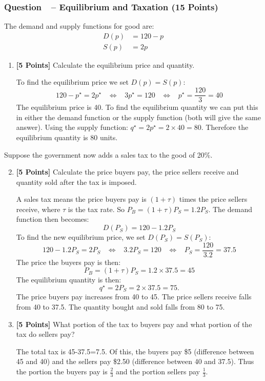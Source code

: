 \documentclass[12pt]{article}
\newcounter{question}[section]
\newcommand{\question}[1]{\refstepcounter{question}
  \subsubsection*{Question~\thequestion~-- #1}}
\newenvironment{subquestions}{
  \begin{enumerate}[label=(\roman*)]}{\end{enumerate}}
\begin{document}
\question{Equilibrium and Taxation (15 Points)}
The demand and supply functions for good are:
\begin{align*}
  D\left( p \right) &= 120 - p \\
  S\left( p \right) &= 2p
\end{align*}
\begin{subquestions}
  \item \textbf{[5 Points]} Calculate the equilibrium price and quantity.

    \textcolor{solution-color}{
      To find the equilibrium price we set $D\left( p
      \right)=S\left( p \right)$:
      \[
         120-p^\star=2p^\star \;\;\;\Longleftrightarrow\;\;\;
         3p^\star=120 \;\;\;\Longleftrightarrow\;\;\;
         p^\star= \frac{120}{3}=40
      \]
      The equilibrium price is 40. To find the equilibrium quantity we can put
      this in either the demand function or the supply function (both will give
      the same answer). Using the supply function: $q^\star = 2p^\star = 2
      \times 40 = 80$. Therefore the equilibrium quantity is 80 units.
    }
\end{subquestions}
Suppose the government now adds a sales tax to the good of 20\%.
\begin{subquestions}
  \setcounter{enumi}{1}
  \item \textbf{[5 Points]} Calculate the price buyers pay, the price sellers receive and quantity
    sold after the tax is imposed.

    \textcolor{solution-color}{
      A sales tax means the price buyers pay is $\left( 1+\tau \right)$ times
      the price sellers receive, where $\tau$ is the tax rate. So $P_B=\left(
      1+\tau \right)P_S=1.2P_S$. The demand function then becomes:
      \[
        D\left( P_S \right)= 120 - 1.2 P_S
      \]
      To find the new equilibrium price, we set $D\left( P_S \right)=S\left(
      P_S \right)$:
      \[
        120-1.2 P_S = 2P_S \;\;\;\Longleftrightarrow\;\;\;
        3.2P_S=120 \;\;\;\Longleftrightarrow\;\;\;
        P_S=\frac{120}{3.2}=37.5
      \]
      The price the buyers pay is then:
      \[
        P_B = \left( 1+\tau \right)P_S = 1.2 \times 37.5 = 45
      \]
      The equilibrium quantity is then:
      \[
        q^\star = 2P_S = 2 \times 37.5 = 75.
      \]
      The price buyers pay increases from 40 to 45. The price sellers receive
      falls from 40 to 37.5. The quantity bought and sold falls from 80 to 75.
    }
  \item \textbf{[5 Points]} What portion of the tax to buyers pay and what portion of the tax do
    sellers pay?

    \textcolor{solution-color}{
      The total tax is 45-37.5=7.5. Of this, the buyers pay \$5 (difference
      between 45 and 40) and the sellers
      pay \$2.50 (difference between 40 and 37.5). Thus the portion the buyers
      pay is $\frac{2}{3}$ and the portion sellers pay $\frac{1}{3}$.
    }
\end{subquestions}
\end{document}
